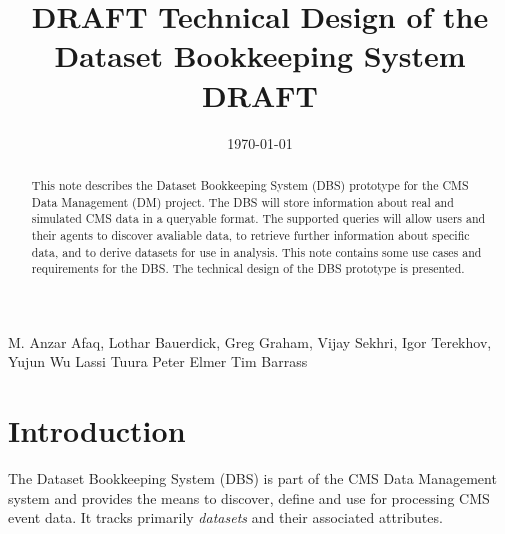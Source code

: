 \documentclass{cmspaper}
\begin{document}

\begin{titlepage}

   \date{\today}

  \title{DRAFT Technical Design of the Dataset Bookkeeping System DRAFT}


  \begin{Authlist}
    M. Anzar Afaq, Lothar Bauerdick, Greg Graham, Vijay Sekhri, Igor Terekhov, 
    Yujun Wu
    Lassi Tuura
    Peter Elmer
    Tim Barrass
  \end{Authlist}


  \begin{abstract}
      This note describes the Dataset Bookkeeping System (DBS) prototype for the 
  CMS Data Management (DM) project.  The DBS will
  store information about real and simulated CMS data in a queryable format. 
  The supported queries will allow users and their agents to discover avaliable 
  data, to retrieve further information about specific data, and to 
  derive datasets for use in analysis. This note contains some use cases 
  and requirements for the DBS.  The technical design of the DBS prototype
  is presented.
    \end{abstract} 

  
\end{titlepage}

\setcounter{page}{2}%

\section{Introduction}
\label{sec:intro}

The Dataset Bookkeeping System (DBS) is part of the CMS Data Management system
and provides the means to discover, define and use for processing CMS event 
data. It tracks primarily {\em datasets} and their associated attributes.
\end{document}
